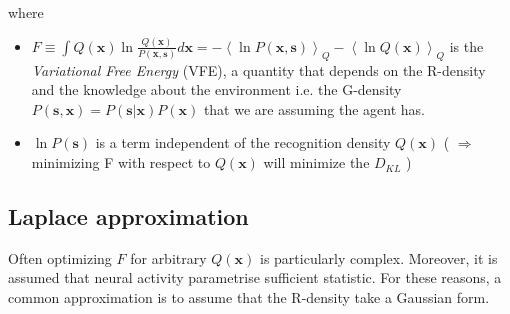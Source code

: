 \documentclass[a4paper, 10pt]{article}
\begin{document}
where
\begin{itemize}

\item $F \equiv \int Q(\mathbf x) \ln \frac{Q(\mathbf x)}{P(\mathbf x,\mathbf s)}d\mathbf x = - \left< \ln P(\mathbf x,\mathbf s) \right>_{Q} - \left< \ln Q(\mathbf x) \right>_{Q}$ is the \emph{Variational Free Energy} (VFE), a quantity that depends on the R-density and the knowledge about the environment i.e. the G-density $P(\mathbf s, \mathbf x) = P(\mathbf s|\mathbf x)P(\mathbf x)$ that we are assuming the agent has. 
\item $\ln P(\mathbf s)$ is a term independent of the recognition density $Q(\mathbf x)$ ( $\Rightarrow$ minimizing F with respect to $Q(\mathbf x)$ will minimize the $D_{KL}$ )

\end{itemize}

\subsection*{Laplace approximation}

Often optimizing $F$ for arbitrary $Q(\mathbf x)$ is particularly complex. Moreover, it is assumed that neural activity parametrise sufficient statistic.
For these reasons, a common approximation is to assume that the R-density take a Gaussian form. 
\end{document}
